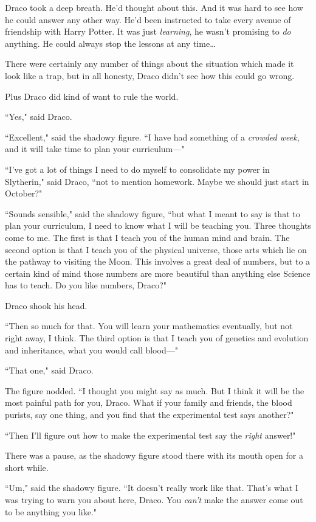 Draco took a deep breath. He'd thought about this. And it was hard to see how he could answer any other way. He'd been instructed to take every avenue of friendship with Harry Potter. It was just \emph{learning}, he wasn't promising to \emph{do} anything. He could always stop the lessons at any time{\ldots}

There were certainly any number of things about the situation which made it look like a trap, but in all honesty, Draco didn't see how this could go wrong.

Plus Draco did kind of want to rule the world.

``Yes," said Draco.

``Excellent," said the shadowy figure. ``I have had something of a \emph{crowded week}, and it will take time to plan your curriculum---"

``I've got a lot of things I need to do myself to consolidate my power in Slytherin," said Draco, ``not to mention homework. Maybe we should just start in October?"

``Sounds sensible," said the shadowy figure, ``but what I meant to say is that to plan your curriculum, I need to know what I will be teaching you. Three thoughts come to me. The first is that I teach you of the human mind and brain. The second option is that I teach you of the physical universe, those arts which lie on the pathway to visiting the Moon. This involves a great deal of numbers, but to a certain kind of mind those numbers are more beautiful than anything else Science has to teach. Do you like numbers, Draco?"

Draco shook his head.

``Then so much for that. You will learn your mathematics eventually, but not right away, I think. The third option is that I teach you of genetics and evolution and inheritance, what you would call blood---"

``That one," said Draco.

The figure nodded. ``I thought you might say as much. But I think it will be the most painful path for you, Draco. What if your family and friends, the blood purists, say one thing, and you find that the experimental test says another?"

``Then I'll figure out how to make the experimental test say the \emph{right} answer!"

There was a pause, as the shadowy figure stood there with its mouth open for a short while.

``Um," said the shadowy figure. ``It doesn't really work like that. That's what I was trying to warn you about here, Draco. You \emph{can't} make the answer come out to be anything you like."

